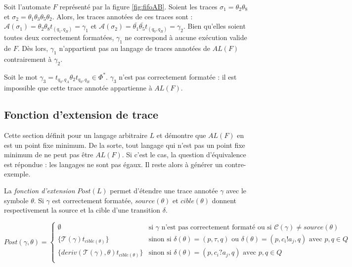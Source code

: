 \begin{example}
Soit l'automate $F$ représenté par la figure \ref{fig:fifoAB}. Soient les traces $\sigma_1=\theta_2\theta_8$ et $\sigma_2=\theta_1\theta_3\theta_5\theta_2$. Alors, les traces annotées de ces traces sont : $\mathcal{A}(\sigma_1)=\theta_2\theta_8t_{(q_1,q_B)}=\gamma_1$ et $\mathcal{A}(\sigma_2)=\bar{\theta_1}\bar{\theta_5}t_{(q_0,q_B)}=\gamma_2$.
Bien qu'elles soient toutes deux correctement formatées, $\gamma_1$ ne correspond à aucune exécution valide de $F$. Dès lors, $\gamma_1$ n'appartient pas au langage de traces annotées de $AL(F)$ contrairement à $\gamma_2$.

Soit le mot $\gamma_3=t_{q_0,q_A}\theta_2 t_{q_0,q_B} \in \Phi^*$. $\gamma_3$ n'est pas correctement formatée : il est impossible que cette trace annotée appartienne à $AL(F)$.
\end{example}



\subsection{Fonction d'extension de trace}\label{trace:extension}

Cette section définit \fl pour un langage arbitraire $L$ et démontre que $AL(F)$ en est un point fixe minimum. De la sorte, tout langage qui n'est pas un point fixe minimum de \fl ne peut pas être $AL(F)$. Si c'est le cas, la question d'équivalence est répondue : les langages ne sont pas égaux. Il reste alors à générer un contre-exemple.

La \emph{fonction d'extension} $Post(L)$ permet d'étendre une trace annotée $\gamma$ avec le symbole $\theta$. Si $\gamma$ est correctement formatée, $source(\theta)$ et $cible(\theta)$ donnent respectivement la source et la cible d'une transition $\delta$.

$$
Post(\gamma,\theta) = \left\{ \begin{array}{ll}
    \emptyset & \text{si } \gamma \text{ n'est pas correctement formaté ou si } \mathcal{C}(\gamma)\neq source(\theta)\\
    \{\mathcal{T}(\gamma)t_{cible(\theta)}\} & \text{sinon si }\delta(\theta)=(p,\tau,q) \text{ ou } \delta(\theta)=(p,c_i!a_j,q) \text{ avec }p,q\in Q\\
    \{deriv(\mathcal{T}(\gamma),\theta)t_{cible(\theta)}\}& \text{sinon si } \delta(\theta)=(p,c_i?a_j,q) \text{ avec }p,q\in Q \\
    \end{array} \right.
$$

